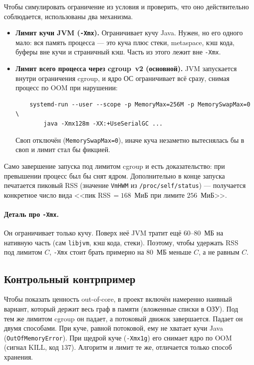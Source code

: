 Чтобы симулировать ограничение из условия и проверить, что оно действительно соблюдается, использованы
два механизма.
\begin{itemize}[itemsep=3pt]
  \item \textbf{Лимит кучи JVM (\texttt{-Xmx}).} Ограничивает кучу Java. Нужен, но его одного мало:
        вся память процесса --- это куча плюс стеки, metaspace, кэш кода, буферы вне кучи и страничный
        кэш. Часть из этого лежит вне \texttt{-Xmx}.
  \item \textbf{Лимит всего процесса через cgroup~v2 (основной).} JVM запускается внутри ограничения
        cgroup, и ядро ОС ограничивает всё сразу, снимая процесс по OOM при нарушении:
        \begin{verbatim}
    systemd-run --user --scope -p MemoryMax=256M -p MemorySwapMax=0 \
        java -Xmx128m -XX:+UseSerialGC ...
        \end{verbatim}
        Своп отключён (\texttt{MemorySwapMax=0}), иначе куча незаметно вытеснялась бы в своп и лимит
        стал бы фикцией.
\end{itemize}
Само завершение запуска под лимитом cgroup и есть доказательство: при превышении процесс был бы снят
ядром. Дополнительно в конце запуска печатается пиковый RSS (значение \texttt{VmHWM} из
\texttt{/proc/self/status}) --- получается конкретное число вида <<пик RSS\,$=168$~МиБ при лимите
$256$~МиБ>>.

\paragraph{Деталь про \texttt{-Xmx}.} Он ограничивает только кучу. Поверх неё JVM тратит ещё
$60$--$80$~МБ на нативную часть (сам \texttt{libjvm}, кэш кода, стеки). Поэтому, чтобы удержать RSS
под лимитом $C$, \texttt{-Xmx} стоит брать примерно на $80$~МБ меньше $C$, а не равным $C$.

\subsection{Контрольный контрпример}
Чтобы показать ценность out-of-core, в проект включён намеренно наивный вариант, который держит весь
граф в памяти (вложенные списки в ОЗУ). Под тем же лимитом cgroup он падает, а потоковый движок
завершается. Падает он двумя способами. При куче, равной потоковой, ему не хватает кучи Java
(\texttt{OutOfMemoryError}). При щедрой куче (\texttt{-Xmx1g}) его снимает ядро по OOM (сигнал KILL,
код $137$). Алгоритм и лимит те же, отличается только способ хранения.

